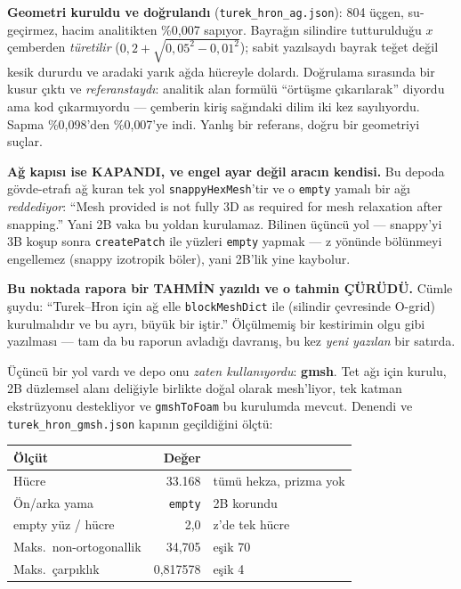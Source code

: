 \documentclass[11pt,a4paper]{article}
\begin{document}
\begin{description}
        \textbf{Geometri kuruldu ve doğrulandı} (\texttt{turek\_hron\_ag.json}):
        804 üçgen, su-geçirmez, hacim analitikten \%0{,}007
        sapıyor. Bayrağın silindire tutturulduğu $x$ çemberden \emph{türetilir}
        ($0{,}2 + \sqrt{0{,}05^2 - 0{,}01^2}$); sabit yazılsaydı bayrak teğet
        değil kesik dururdu ve aradaki yarık ağda hücreyle dolardı. Doğrulama
        sırasında bir kusur çıktı ve \emph{referanstaydı}: analitik alan
        formülü ``örtüşme çıkarılarak'' diyordu ama kod çıkarmıyordu --- çemberin
        kiriş sağındaki dilim iki kez sayılıyordu. Sapma \%0{,}098'den
        \%0{,}007'ye indi. Yanlış bir referans, doğru bir geometriyi suçlar.

        \textbf{Ağ kapısı ise KAPANDI, ve engel ayar değil aracın kendisi.}
        Bu depoda gövde-etrafı ağ kuran tek yol \texttt{snappyHexMesh}'tir ve o
        \texttt{empty} yamalı bir ağı \emph{reddediyor}: ``Mesh provided is not
        fully 3D as required for mesh relaxation after snapping.'' Yani 2B vaka
        bu yoldan kurulamaz. Bilinen üçüncü yol --- snappy'yi 3B koşup sonra
        \texttt{createPatch} ile yüzleri \texttt{empty} yapmak --- z yönünde
        bölünmeyi engellemez (snappy izotropik böler), yani 2B'lik yine
        kaybolur.

        \textbf{Bu noktada rapora bir TAHMİN yazıldı ve o tahmin ÇÜRÜDÜ.}
        Cümle şuydu: ``Turek--Hron için ağ elle \texttt{blockMeshDict} ile
        (silindir çevresinde O-grid) kurulmalıdır ve bu ayrı, büyük bir
        iştir.'' Ölçülmemiş bir kestirimin olgu gibi yazılması --- tam da bu
        raporun avladığı davranış, bu kez \emph{yeni yazılan} bir satırda.

        \noindent Üçüncü bir yol vardı ve depo onu \emph{zaten kullanıyordu}:
        \textbf{gmsh}. Tet ağı için kurulu, 2B düzlemsel alanı deliğiyle
        birlikte doğal olarak mesh'liyor, tek katman ekstrüzyonu destekliyor
        ve \texttt{gmshToFoam} bu kurulumda mevcut. Denendi ve
        \texttt{turek\_hron\_gmsh.json} kapının geçildiğini ölçtü:

\begin{center}\footnotesize
\begin{tabular}{@{}lrl@{}}
\toprule
Ölçüt & Değer & \\
\midrule
Hücre & 33.168 & tümü hekza, prizma yok \\
Ön/arka yama & \texttt{empty} & 2B korundu \\
empty yüz / hücre & 2{,}0 & z'de tek hücre \\
Maks.\ non-ortogonallik & 34{,}705 & eşik 70 \\
Maks.\ çarpıklık & 0{,}817578 & eşik 4 \\
\bottomrule
\end{tabular}
\end{center}


\end{description}
\end{document}
